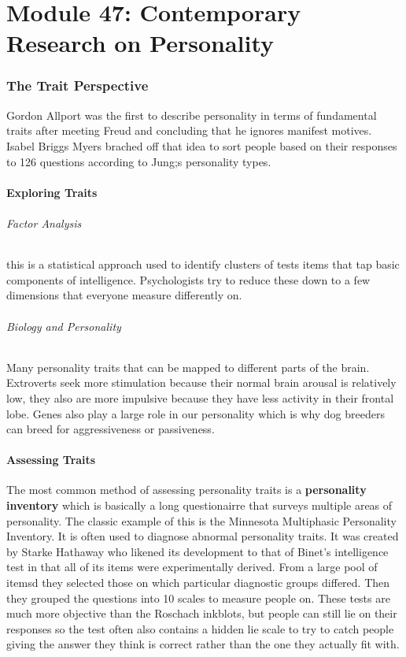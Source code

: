 \documentclass[12pt]{article}
\begin{document}
\part*{Module 47: Contemporary Research on Personality}
\section*{The Trait Perspective}
Gordon Allport was the first to describe personality in terms of fundamental traits after meeting Freud and concluding that he ignores manifest motives. Isabel Briggs Myers brached off that idea to sort people based on their responses to 126 questions according to Jung;s personality types.
\subsection*{Exploring Traits}
\paragraph*{Factor Analysis} this is a statistical approach used to identify clusters of tests items that tap basic components of intelligence. Psychologists try to reduce these down to a few dimensions that everyone measure differently on. 
\paragraph*{Biology and Personality}
Many personality traits that can be mapped to different parts of the brain. Extroverts seek more stimulation because their normal brain arousal is relatively low, they also are more impulsive because they have less activity in their frontal lobe. Genes also play a large role in our personality which is why dog breeders can breed for aggressiveness or passiveness. 
\subsection*{Assessing Traits}
The most common method of assessing personality traits is a \textbf{personality inventory} which is basically a long questionairre that surveys multiple areas of personality. The classic example of this is the Minnesota Multiphasic Personality Inventory. It is often used to diagnose abnormal personality traits. It was created by Starke Hathaway who likened its development to that of Binet's intelligence test in that all of its items were experimentally derived. From a large pool of itemsd they selected those on which particular diagnostic groups differed. Then they grouped the questions into 10 scales to measure people on. These tests are much more objective than the Roschach inkblots, but people can still lie on their responses so the test often also contains a hidden lie scale to try to catch people giving the answer they think is correct rather than the one they actually fit with. 
\end{document}

